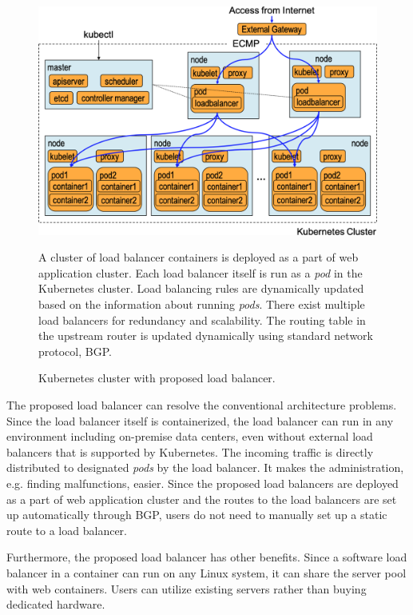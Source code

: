 \begin{figure}[h]
  \begin{center}
  \includegraphics[width=0.8\columnwidth]{Figs/K8sProposed}
  \caption{Kubernetes cluster with proposed load balancer.}
  \label{fig:K8sProposed}
  \begin{minipage}{0.9\columnwidth}
  A cluster of load balancer containers is deployed as a part of web application cluster.
  Each load balancer itself is run as a {\em pod} in the Kubernetes cluster. 
  Load balancing rules are dynamically updated based on the information about running {\em pods}.
  There exist multiple load balancers for redundancy and scalability.
  The routing table in the upstream router is updated dynamically using standard network protocol, BGP.
  \end{minipage}
  \end{center}
\end{figure}

The proposed load balancer can resolve the conventional architecture problems.
Since the load balancer itself is containerized, the load balancer can run in any environment including on-premise data centers,
even without external load balancers that is supported by Kubernetes.
The incoming traffic is directly distributed to designated {\em pods} by the load balancer.
It makes the administration, e.g. finding malfunctions, easier.
Since the proposed load balancers are deployed as a part of web application cluster and the routes to the load balancers are set up automatically through BGP, users do not need to manually set up a static route to a load balancer.

Furthermore, the proposed load balancer has other benefits.
Since a software load balancer in a container can run on any Linux system, it can share the server pool with web containers.
Users can utilize existing servers rather than buying dedicated hardware.

